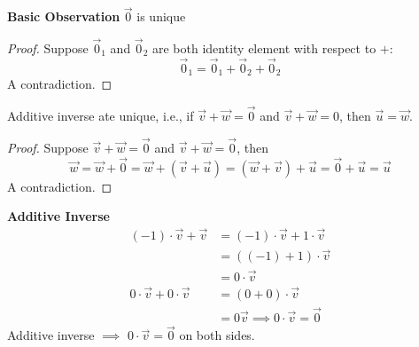 \textbf{Basic Observation}  
$\vec 0$ is unique 
\begin{proof}
    Suppose $\vec 0_1$ and $\vec 0_2$ are both identity element with respect to $+$:
    \[ \vec 0_1 = \vec 0_1 + \vec 0_2 + \vec 0_2\]
    A contradiction.
\end{proof}
Additive inverse ate unique, i.e., if $\vec v + \vec w = \vec 0$ and $\vec v + \vec w = 0$, then $\vec u = \vec w$. 
\begin{proof}
    Suppose $\vec v + \vec w = \vec 0$ and $\vec v + \vec w = \vec 0$, then
    \[\vec w = \vec w + \vec 0 = \vec w + (\vec v + \vec u) = (\vec w + \vec v) + \vec u = \vec 0 + \vec u = \vec u\]
    A contradiction.
\end{proof}
\noindent \textbf{Additive Inverse} 
\begin{align*}
    (-1) \cdot \vec v + \vec v &= (-1) \cdot \vec v + 1 \cdot \vec v \\
    &= ((-1) + 1) \cdot \vec v \\
    &= 0 \cdot \vec v \\
    0 \cdot \vec v + 0 \cdot \vec v &= (0 + 0) \cdot \vec v \\ &= 0 \vec v \implies \boxed{ 0 \cdot \vec v = \vec 0}
\end{align*} 
Additive inverse $\implies$ $0 \cdot \vec v = \vec 0$ on both sides. 
